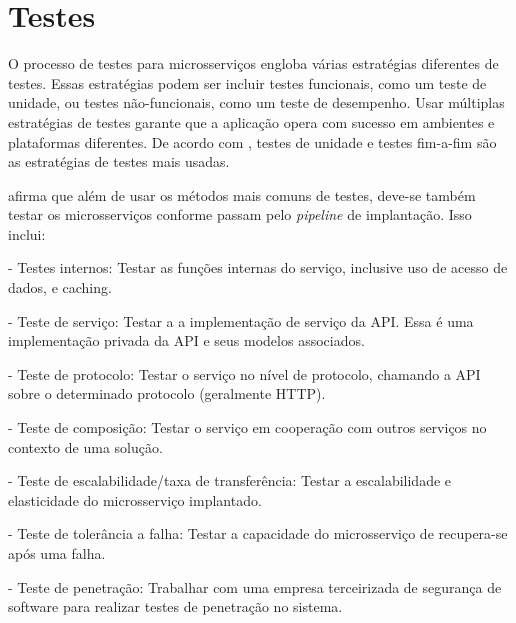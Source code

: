 \section{Testes}

O processo de testes para microsserviços engloba várias estratégias diferentes de testes. Essas estratégias podem ser incluir testes funcionais, como um teste de unidade, ou testes não-funcionais, como um teste de desempenho. Usar múltiplas estratégias de testes garante que a aplicação opera com sucesso em ambientes e plataformas diferentes. De acordo com , testes de unidade e testes fim-a-fim são as estratégias de testes mais usadas.


 afirma que além de usar os métodos mais comuns de testes, deve-se também testar os microsserviços conforme passam pelo \emph{pipeline} de implantação. Isso inclui:

- Testes internos: Testar as funções internas do serviço, inclusive uso de acesso de dados, e caching.

- Teste de serviço: Testar a a implementação de serviço da API. Essa é uma implementação privada da API e seus modelos associados.

- Teste de protocolo: Testar o serviço no nível de protocolo, chamando a API sobre o determinado protocolo (geralmente HTTP).

- Teste de composição: Testar o serviço em cooperação com outros serviços no contexto de uma solução.

- Teste de escalabilidade/taxa de transferência: Testar a escalabilidade e elasticidade do microsserviço implantado.

- Teste de tolerância a falha: Testar a capacidade do microsserviço de recupera-se após uma falha.

- Teste de penetração: Trabalhar com uma empresa terceirizada de segurança de software para realizar testes de penetração no sistema. \cite{Familiar2015}


